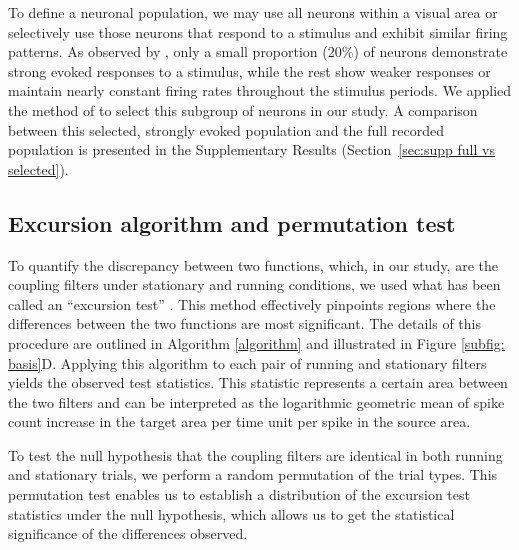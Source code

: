 \documentclass[12pt]{article}
\begin{document}
To define a neuronal population, we may use all neurons within a visual area or selectively use those neurons that respond to a stimulus and exhibit similar firing patterns. As observed by \citet{chen2022population}, only a small proportion (20\%) of neurons demonstrate strong evoked responses to a stimulus, while the rest show weaker responses or maintain nearly constant firing rates throughout the stimulus periods. We applied the method of \citet{chen2022population} to select this subgroup of neurons in our study. A comparison between this selected, strongly evoked population and the full recorded population is presented in the Supplementary Results (Section~\ref{sec:supp full vs selected}).


\subsection{Excursion algorithm and permutation test}
To quantify the discrepancy between two functions, which, in our study, are the coupling filters under stationary and running conditions, we used what has been called an ``excursion test'' \cite{xu2011characterizing}. This method effectively pinpoints regions where the differences between the two functions are most significant. The details of this procedure are outlined in Algorithm \ref{algorithm} and illustrated in Figure \ref{subfig: basis}D. Applying this algorithm to each pair of running and stationary filters yields the observed test statistics. This statistic represents a certain area between the two filters and can be interpreted as the logarithmic geometric mean of spike count increase in the target area per time unit per spike in the source area.

To test the null hypothesis that the coupling filters are identical in both running and stationary trials, we perform a random permutation of the trial types. This permutation test enables us to establish a distribution of the excursion test statistics under the null hypothesis, which allows us to get the statistical significance of the differences observed. 
\end{document}
